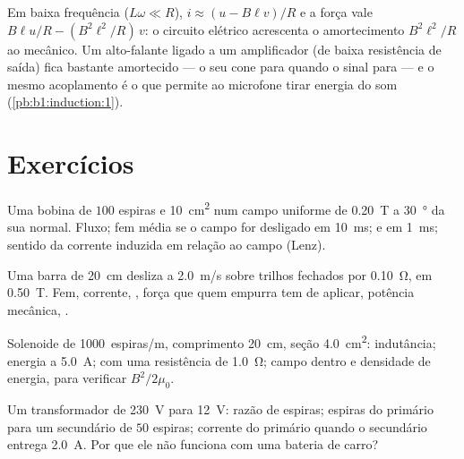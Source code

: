 \begin{remark}\label{rem:b1:induction:damping}
Em baixa frequência ($L\omega \ll R$), $i \approx (u - B\ell v)/R$ e a força vale
$B\ell u/R - (B^2\ell^2/R)\,v$: o circuito elétrico acrescenta o amortecimento
$B^2\ell^2/R$ ao mecânico. Um alto-falante ligado a um
amplificador (de baixa resistência de saída) fica bastante amortecido --- o seu cone para
quando o sinal para --- e o mesmo acoplamento é o que permite ao
microfone tirar energia do som (\cref{pb:b1:induction:1}).
\end{remark}

\section{Exercícios}

\begin{exercise}[$\star$]\label{exo:b1:induction:1}
Uma bobina de $100$ espiras e \qty{10}{cm^2} num campo uniforme de \qty{0.20}{T} a
\qty{30}{\degree} da sua normal. Fluxo; fem média se o campo for desligado
em \qty{10}{ms}; e em \qty{1}{ms}; sentido da corrente induzida
em relação ao campo (Lenz).
\end{exercise}

\begin{exercise}[$\star$]\label{exo:b1:induction:2}
Uma barra de \qty{20}{cm} desliza a \qty{2.0}{m/s} sobre trilhos fechados por
\qty{0.10}{\ohm}, em \qty{0.50}{T}. Fem, corrente, , força que
quem empurra tem de aplicar, potência mecânica, .
\end{exercise}

\begin{exercise}[$\star$]\label{exo:b1:induction:3}
Solenoide de \qty{1000}{espiras/m}, comprimento \qty{20}{cm}, seção \qty{4.0}{cm^2}:
indutância; energia a \qty{5.0}{A};  com uma resistência de
\qty{1.0}{\ohm}; campo dentro e densidade de energia, para verificar $B^2/2\mu_0$.
\end{exercise}

\begin{exercise}[$\star$]\label{exo:b1:induction:4}
Um transformador de \qty{230}{V} para \qty{12}{V}: razão de espiras; espiras do
primário para um secundário de $50$ espiras; corrente do primário quando o secundário
entrega \qty{2.0}{A}. Por que ele não funciona com uma bateria de carro?
\end{exercise}

